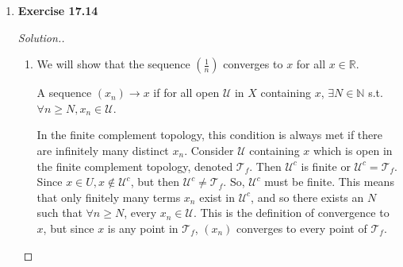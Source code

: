 \documentclass{article}
\newcommand{\T}{\mathcal{T}}
\newcommand{\U}{\mathcal{U}}
\newcommand{\R}{\mathbb{R}}
\newcommand{\V}{\mathcal{V}}
\newcommand{\sk}{\smallskip}
\begin{document}
\begin{enumerate}
\begin{proof}[Solution.]
        \begin{align*}
            (x, y) \in \overline{A \times B} &\Leftrightarrow \forall \U \times \V \in X \times Y \text{ s.t. } (x, y) \in \U \times \V, (\U \times \V) \cap (A \times B) \neq \emptyset \\
            &\Leftrightarrow (\U \cap A) \times (\V \cap B) \neq \emptyset \\
            &\Leftrightarrow \U \times A \neq \emptyset \text{ and } \V \times B \neq \emptyset \\
            &\Leftrightarrow x \in \overline{A} \text{ and } y \in \overline{B} \\
            &\Leftrightarrow (x, y) \in \overline{A} \times \overline{B}
        \end{align*}

        The first equivalence is the definition of the closure of $\overline{A \times B}$, the second is the property that $(A \times B) \cap (C \times D) = (A \cap C) \times (B \cap D)$, and the third is true because if the Cartesian product is non-empty, each set must be non-empty. The fourth equivalence is true, because we have that any open set $\U$ in $X$ containing $x$ has a non-empty intersection with $A$, and so $x \in \overline{A}$, and by similar logic $y \in \overline{B}$. The last is true by definition. 

        \sk 

        Since $(x, y) \in \overline{A \times B} \Leftrightarrow (x, y) \in \overline{A} \times \overline{B}$, we have that $\overline{A \times B} = \overline{A} \times \overline{B}$
    \end{proof}

    \item 
    \textbf{Exercise 17.14} 
    \begin{proof}[Solution.]
        \begin{enumerate}
            \item We will show that the sequence $\left(\frac{1}{n}\right)$ converges to $x$ for all $x \in \R$. 

            \sk

            A sequence $(x_n) \rightarrow x$ if for all open $\U$ in $X$ containing $x$, $\exists N \in \mathbb{N}$ s.t. $\forall n \geq N, x_n \in \U$. 

            \sk

            In the finite complement topology, this condition is always met if there are infinitely many distinct $x_n$. Consider $\U$ containing $x$ which is open in the finite complement topology, denoted $\T_f$. Then $\U^c$ is finite or $\U^c = \T_f$. Since $x \in U, x \notin \U^c$, but then $\U^c \neq \T_f$. So, $\U^c$ must be finite. This means that only finitely many terms $x_n$ exist in $\U^c$, and so there exists an $N$ such that $\forall n \geq N$, every $x_n \in \U$. This is the definition of convergence to $x$, but since $x$ is any point in $\T_f$, $(x_n)$ converges to every point of $\T_f$. 


\end{enumerate}
\end{proof}
\end{enumerate}
\end{document}
